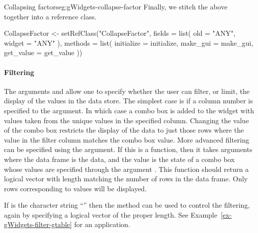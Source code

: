 \begin{example}{Collapsing factors}{eg:gWidgets-collapse-factor}
Finally, we stitch the above together into a reference class.
\begin{Schunk}
\begin{Sinput}
 CollapseFactor <- setRefClass("CollapseFactor",
                               fields = list(
                                old = "ANY",
                                widget = "ANY"
                                ),
                              methods = list(
                                initialize = initialize,
                                make_gui = make_gui,
                                get_value = get_value
                              ))
\end{Sinput}
\end{Schunk}


  
\end{example}


\paragraph{Filtering}
The arguments  and
 allow one to specify whether the user
can filter, or limit, the display of the values in the data store. The
simplest case is if a column number is specified to the
 argument. In which case a combo box is added to
the widget with values taken from the unique values in the specified
column. Changing the value of the combo box restricts the display of
the data to just those rows where the value in the filter column
matches the combo box value. More advanced filtering can be specified
using the  argument. If this is a
function, then it takes arguments 
where the data frame is the data, and the  value is
the state of a combo box whose values are specified through the
argument . This function should return
a logical vector with length matching the number of rows in the data
frame.  Only rows corresponding to  values will be
displayed. 


If  is the character string ``'' then
the  method can be used to control the
filtering, again by specifying a logical vector of the proper
length. See Example~\ref{ex-gWidgets-filter-gtable} for an
application.



